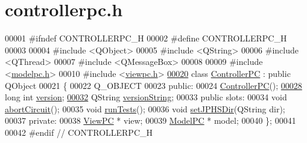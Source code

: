 \hypertarget{controllerpc_8h_source}{\section{controllerpc.\-h}
}

\begin{DoxyCode}
00001 \textcolor{preprocessor}{#ifndef CONTROLLERPC\_H}
00002 \textcolor{preprocessor}{}\textcolor{preprocessor}{#define CONTROLLERPC\_H}
00003 \textcolor{preprocessor}{}
00004 \textcolor{preprocessor}{#include <QObject>}
00005 \textcolor{preprocessor}{#include <QString>}
00006 \textcolor{preprocessor}{#include <QThread>}
00007 \textcolor{preprocessor}{#include <QMessageBox>}
00008 
00009 \textcolor{preprocessor}{#include <\hyperlink{modelpc_8h}{modelpc.h}>}
00010 \textcolor{preprocessor}{#include <\hyperlink{viewpc_8h}{viewpc.h}>}
\hypertarget{controllerpc_8h_source_l00020}{}\hyperlink{class_controller_p_c}{00020} \textcolor{keyword}{class }\hyperlink{class_controller_p_c}{ControllerPC} : \textcolor{keyword}{public} QObject
00021 \{
00022     Q\_OBJECT
00023 \textcolor{keyword}{public}:
00024     \hyperlink{class_controller_p_c_afa6c92d67bf3b6531c42385fc5938003}{ControllerPC}();
\hypertarget{controllerpc_8h_source_l00028}{}\hyperlink{class_controller_p_c_a9eb43c34237d66751a6411e55cf5f55e}{00028}     \textcolor{keywordtype}{long} \textcolor{keywordtype}{int} \hyperlink{class_controller_p_c_a9eb43c34237d66751a6411e55cf5f55e}{version};
\hypertarget{controllerpc_8h_source_l00032}{}\hyperlink{class_controller_p_c_a0e63cca37d6ce2e660f3380400c2c5f3}{00032}     QString \hyperlink{class_controller_p_c_a0e63cca37d6ce2e660f3380400c2c5f3}{versionString};
00033 \textcolor{keyword}{public} slots:
00034     \textcolor{keywordtype}{void} \hyperlink{class_controller_p_c_a8814989f7be1214e06b2e720889066b0}{abortCircuit}();
00035     \textcolor{keywordtype}{void} \hyperlink{class_controller_p_c_aaa59fc90e1ef731eee4560ec87e43707}{runTests}();
00036     \textcolor{keywordtype}{void} \hyperlink{class_controller_p_c_ac00d29685a7e5b780c01eb438e10f96d}{setJPHSDir}(QString dir);
00037 \textcolor{keyword}{private}:
00038     \hyperlink{class_view_p_c}{ViewPC} * view;
00039     \hyperlink{class_model_p_c}{ModelPC} * model;
00040 \};
00041 
00042 \textcolor{preprocessor}{#endif // CONTROLLERPC\_H}
\end{DoxyCode}
